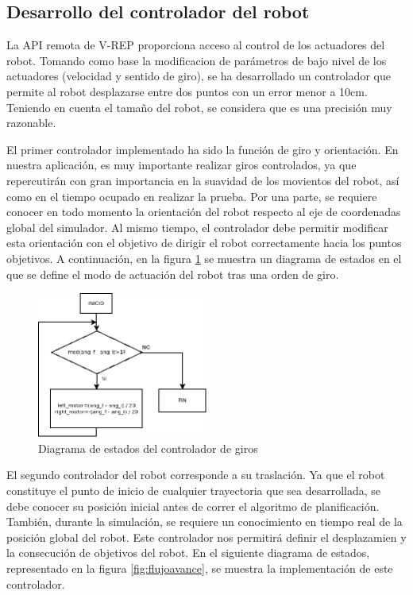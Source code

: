 \subsection{Desarrollo del controlador del robot}

La API remota de V-REP proporciona acceso al control de los actuadores del robot. Tomando como base la modificacion de parámetros de bajo nivel de los actuadores (velocidad y sentido de giro), se ha desarrollado un controlador que permite al robot desplazarse entre dos puntos con un error menor a 10cm. Teniendo en cuenta el tamaño del robot, se considera que es una precisión muy razonable.

El primer controlador implementado ha sido la función de giro y orientación. En nuestra aplicación, es muy importante realizar giros controlados, ya que repercutirán con gran importancia en la suavidad de los movientos del robot, así como en el tiempo ocupado en realizar la prueba. Por una parte, se requiere conocer en todo momento la orientación del robot respecto al eje de coordenadas global del simulador. Al mismo tiempo, el controlador debe permitir modificar esta orientación con el objetivo de dirigir el robot correctamente hacia los puntos objetivos. A continuación, en la figura \ref{fig:flujogiro} se muestra un diagrama de estados en el que se define el modo de actuación del robot tras una orden de giro.

\begin{figure}[h]
		\centering
        \includegraphics[width=0.5\textwidth]{images/flujogiro.png}
        \caption{Diagrama de estados del controlador de giros}
        \label{fig:flujogiro}
\end{figure} 

El segundo controlador del robot corresponde a su traslación. Ya que el robot constituye el punto de inicio de cualquier trayectoria que sea desarrollada, se debe conocer su posición inicial antes de correr el algoritmo de planificación. También, durante la simulación, se requiere un conocimiento en tiempo real de la posición global del robot. Este controlador nos permitirá definir el desplazamien y la consecución de objetivos del robot. En el siguiente diagrama de estados, representado en la figura \ref{fig:flujoavance}, se muestra la implementación de este controlador.


